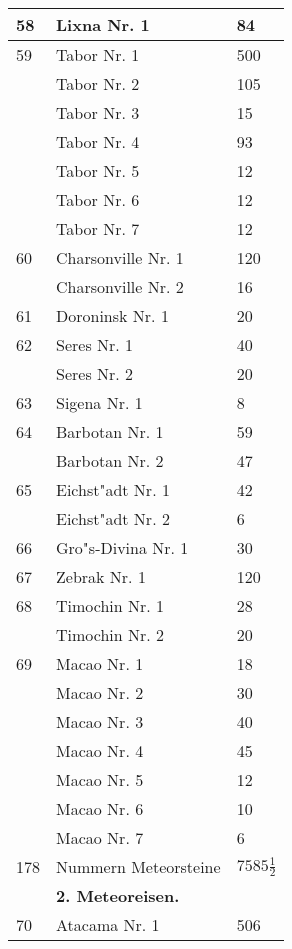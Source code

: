 \documentclass[a4paper, 11pt, oneside, polutonikogreek, german]{article}
\begin{document}
\begin{center}
\begin{longtable}{|l|l|l|}
        58 & Lixna Nr. 1 & 84 \\ \hline
        59 & Tabor Nr. 1 & 500 \\ \hline
          & Tabor Nr. 2 & 105 \\ \hline
          & Tabor Nr. 3 & 15 \\ \hline
          & Tabor Nr. 4 & 93 \\ \hline
          & Tabor Nr. 5 & 12 \\ \hline
          & Tabor Nr. 6 & 12 \\ \hline
          & Tabor Nr. 7 & 12 \\ \hline
        60 & Charsonville Nr. 1 & 120 \\ \hline
          & Charsonville Nr. 2 & 16 \\ \hline
        61 & Doroninsk Nr. 1 & 20 \\ \hline
        62 & Seres Nr. 1 & 40 \\ \hline
          & Seres Nr. 2 & 20 \\ \hline
        63 & Sigena Nr. 1 & 8 \\ \hline
        64 & Barbotan Nr. 1 & 59 \\ \hline
          & Barbotan Nr. 2 & 47 \\ \hline
        65 & Eichst"adt Nr. 1 & 42 \\ \hline
          & Eichst"adt Nr. 2 & 6 \\ \hline
        66 & Gro"s-Divina Nr. 1 & 30 \\ \hline
        67 & Zebrak Nr. 1 & 120 \\ \hline
        68 & Timochin Nr. 1 & 28 \\ \hline
          & Timochin Nr. 2 & 20 \\ \hline
        69 & Macao Nr. 1 & 18 \\ \hline
          & Macao Nr. 2 & 30 \\ \hline
          & Macao Nr. 3 & 40 \\ \hline
          & Macao Nr. 4 & 45 \\ \hline
          & Macao Nr. 5 & 12 \\ \hline
          & Macao Nr. 6 & 10 \\ \hline
          & Macao Nr. 7 & 6 \\ \hline
        178 & Nummern Meteorsteine & $7585\frac{1}{2}$ \\ \hline
          & \textbf{2. Meteoreisen.} &   \\ \hline
        70 & Atacama Nr. 1 & 506 \\ \hline

\end{longtable}
\end{center}
\end{document}
